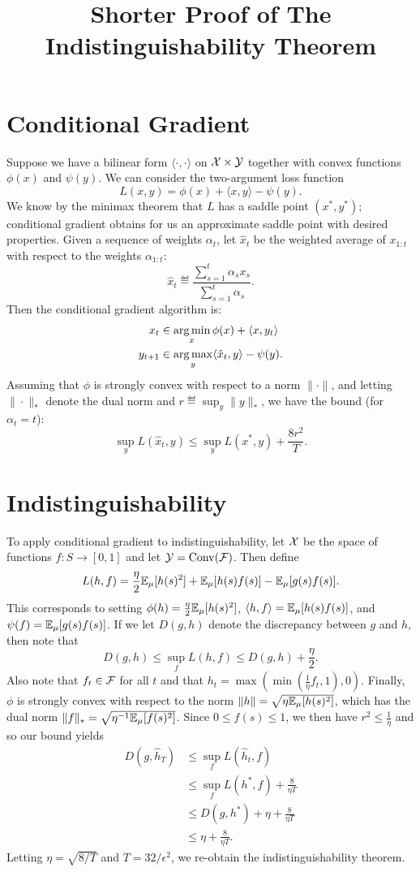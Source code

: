 \documentclass[11pt]{article}
\title{Shorter Proof of The Indistinguishability Theorem}
\begin{document}
\maketitle

\section{Conditional Gradient}
Suppose we have a bilinear form $\langle \cdot, \cdot \rangle$ on 
$\mathcal{X} \times \mathcal{Y}$ together with convex functions $\phi(x)$ and $\psi(y)$. 
We can consider the two-argument loss function
\[ L(x,y) = \phi(x) + \langle x, y \rangle - \psi(y). \]
We know by the minimax theorem that $L$ has a saddle point $(x^*,y^*)$; 
conditional gradient obtains for us an approximate saddle point with 
desired properties. Given a sequence of weights $\alpha_t$, 
let $\hat{x}_t$ be the weighted average of $x_{1:t}$ with respect 
to the weights $\alpha_{1:t}$:
\[ \hat{x}_t \eqdef \frac{\sum_{s=1}^t \alpha_sx_s}{\sum_{s=1}^t \alpha_s}. \]
Then the conditional gradient algorithm is:
\begin{align*}
    x_t &\in \argmin_x \phi(x) + \langle x, y_t \rangle \\
y_{t+1} &\in \argmax_y \langle \hat{x}_t, y \rangle - \psi(y).
\end{align*}
Assuming that $\phi$ is strongly convex with respect to a norm $\|\cdot\|$, 
and letting $\|\cdot\|_*$ denote the dual norm and $r \eqdef \sup_{y} \|y\|_*$, 
we have the bound (for $\alpha_t = t$):
\[ \sup_{y} L(\hat{x}_t, y) \leq \sup_{y} L(x^*, y) + \frac{8r^2}{T}. \]

\section{Indistinguishability}
To apply conditional gradient to indistinguishability, let $\mathcal{X}$ be the space 
of functions $f : S \to [0,1]$ and let $\mathcal{Y} = \operatorname{Conv}(\mathcal{F})$. Then 
define 
\[ L(h,f) = \frac{\eta}{2} \mathbb{E}_{\mu}[h(s)^2] + \mathbb{E}_{\mu}[h(s)f(s)] - \mathbb{E}_{\mu}[g(s)f(s)]. \]
This corresponds to setting $\phi(h) = \frac{\eta}{2} \mathbb{E}_{\mu}[h(s)^2]$, $\langle h, f \rangle = \mathbb{E}_{\mu}[h(s)f(s)]$, 
and $\psi(f) = \mathbb{E}_{\mu}[g(s)f(s)]$. If we let $D(g,h)$ denote 
the discrepancy between $g$ and $h$, then note that
\[ D(g,h) \leq \sup_{f} L(h,f) \leq D(g,h) + \frac{\eta}{2}. \]
Also note that $f_t \in \mathcal{F}$ for all $t$ and that $h_t = \max(\min(\frac{1}{\eta}f_t,1),0)$. Finally, 
$\phi$ is strongly convex with respect to the norm $\|h\| = \sqrt{\eta \mathbb{E}_{\mu}[h(s)^2]}$, which 
has the dual norm $\|f\|_* = \sqrt{\eta^{-1} \mathbb{E}_{\mu}[f(s)^2]}$. Since $0 \leq f(s) \leq 1$, we then have 
$r^2 \leq \frac{1}{\eta}$ and so our bound yields
\begin{align*}
D(g,\hat{h}_T) &\leq \sup_f L(\hat{h}_t, f) \\
 &\leq \sup_f L(h^*, f) + \frac{8}{\eta T} \\
 &\leq D(g, h^*) + \eta + \frac{8}{\eta T} \\
 &\leq \eta + \frac{8}{\eta T}.
\end{align*}
Letting $\eta = \sqrt{8/T}$ and $T = 32/\epsilon^2$, 
we re-obtain the indistinguishability theorem.
\end{document}
